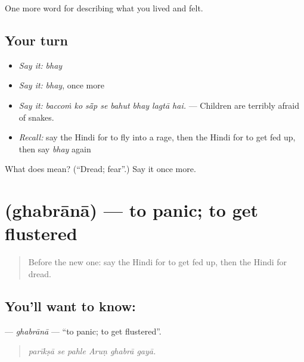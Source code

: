 \begin{grammarlens}[title={What you've built}]
One more word for describing what you lived and felt.
\end{grammarlens}

\subsection*{Your turn}
\begin{itemize}
\raggedright
  \item \emph{Say it:} \emph{bhay}
  \item \emph{Say it:} \emph{bhay}, once more
  \item \emph{Say it:} \emph{baccoṁ ko sā̃p se bahut bhay lagtā hai.} — Children are terribly afraid of snakes.
  \item \emph{Recall:} say the Hindi for to fly into a rage, then the Hindi for to get fed up, then say \emph{bhay} again
\end{itemize}

\begin{tcolorbox}[breakable,colback=teal!4,colframe=teal!35!black,title={Before you move on}]
What does  mean? (\textquotedblleft{}Dread; fear\textquotedblright{}.) Say it once more.
\end{tcolorbox}
\section[\texorpdfstring{\hi{घबराना} (ghabrānā)}{घबराना (ghabrānā)}]{ (ghabrānā) — to panic; to get flustered}

\label{lesson:HI-C457-ghabrana}



\begin{quote}
Before the new one: say the Hindi for to get fed up, then the Hindi for dread.
\end{quote}

\subsection*{You'll want to know: }
\textbf{} — \emph{ghabrānā} — \textquotedblleft{}to panic; to get flustered\textquotedblright{}.

\begin{quote}
     
\end{quote}

\begin{quote}
\emph{parīkṣā se pahle Aruṇ ghabrā gayā.}
\end{quote}

